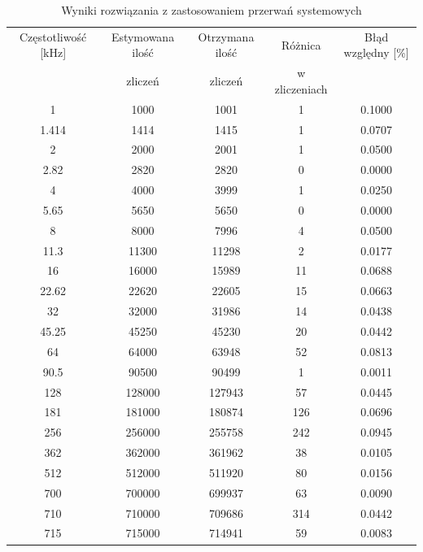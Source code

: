 \documentclass[a4paper,12pt]{article}
\begin{document}
\begin{table}
        \centering
        \caption{Wyniki rozwiązania z zastosowaniem przerwań systemowych}
        \label{rts table}
        \begin{tabular}{|c|c|c|c|c|}  
                \hline 
                Częstotliwość [kHz] & Estymowana ilość & Otrzymana ilość & Różnica  & Błąd względny [\%]\\ 
                &  zliczeń &  zliczeń & w zliczeniach & \\ \hline
                1 & 1000 & 1001 & 1 & 0.1000\\ \hline 
                1.414 & 1414 & 1415 & 1 & 0.0707\\ \hline 
                2 & 2000 & 2001 & 1 & 0.0500\\ \hline 
                2.82 & 2820 & 2820 & 0 & 0.0000\\ \hline 
                4 & 4000 & 3999 & 1 & 0.0250\\ \hline 
                5.65 & 5650 & 5650 & 0 & 0.0000\\ \hline 
                8 & 8000 & 7996 & 4 & 0.0500\\ \hline 
                11.3 & 11300 & 11298 & 2 & 0.0177\\ \hline 
                16 & 16000 & 15989 & 11 & 0.0688\\ \hline 
                22.62 & 22620 & 22605 & 15 & 0.0663\\ \hline 
                32 & 32000 & 31986 & 14 & 0.0438\\ \hline 
                45.25 & 45250 & 45230 & 20 & 0.0442\\ \hline 
                64 & 64000 & 63948 & 52 & 0.0813\\ \hline 
                90.5 & 90500 & 90499 & 1 & 0.0011\\ \hline 
                128 & 128000 & 127943 & 57 & 0.0445\\ \hline 
                181 & 181000 & 180874 & 126 & 0.0696\\ \hline 
                256 & 256000 & 255758 & 242 & 0.0945\\ \hline 
                362 & 362000 & 361962 & 38 & 0.0105\\ \hline 
                512 & 512000 & 511920 & 80 & 0.0156\\ \hline 
                700 & 700000 & 699937 & 63 & 0.0090\\ \hline 
                710 & 710000 & 709686 & 314 & 0.0442\\ \hline 
                715 & 715000 & 714941 & 59 & 0.0083\\ \hline
        \end{tabular}
\end{table}
\end{document}
